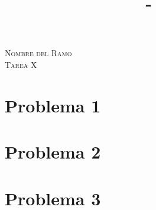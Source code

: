 \documentclass[letterpaper,12pt]{article}
\title{\Titulo\ -\ \Sigla\ \Ramo}
\author{\Nombre}
\newcommand{\Titulo}{Tarea X}
\newcommand{\Ramo}{Nombre del Ramo}
\numberwithin{equation}{section}
\begin{document}
\thispagestyle{empty}


\begin{center}
    \huge{\textsc{\Ramo\\ \Titulo}}
\end{center}

\vspace{1em}



\section{Problema 1}
\vspace{0.8em}
    
\clearpage

\section{Problema 2}
\vspace{0.8em}
    
\clearpage

\section{Problema 3}
\vspace{0.8em}
    
\clearpage
\end{document}
